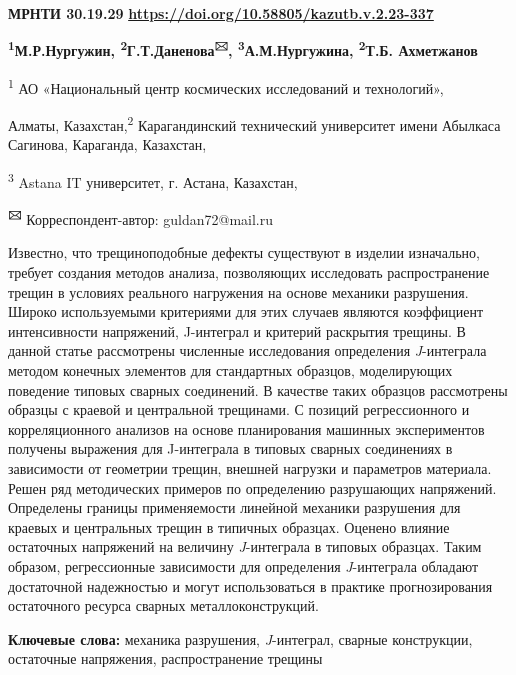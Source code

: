 \newpage
{\bfseries МРНТИ 30.19.29}
\hfill {\bfseries \href{https://doi.org/10.58805/kazutb.v.2.23-337}{https://doi.org/10.58805/kazutb.v.2.23-337}}


\begin{center}
{\bfseries \textsuperscript{1}М.Р.Нургужин, \textsuperscript{2}Г.Т.Даненова\textsuperscript{🖂}, \textsuperscript{3}А.М.Нургужина, \textsuperscript{2}Т.Б. Ахметжанов}

\textsuperscript{1} АО «Национальный центр космических исследований и
технологий»,

Алматы, Казахстан,\textsuperscript{2} Карагандинский технический
университет имени Абылкаса Сагинова, Караганда, Казахстан,

\textsuperscript{3} Astana IT университет, г. Астана, Казахстан,

{\bfseries \textsuperscript{🖂}} Корреспондент-автор: guldan72@mail.ru
\end{center}

Известно, что трещиноподобные дефекты существуют в изделии изначально,
требует создания методов анализа, позволяющих исследовать
распространение трещин в условиях реального нагружения на основе
механики разрушения. Широко используемыми критериями для этих случаев
являются коэффициент интенсивности напряжений, J-интеграл и критерий
раскрытия трещины. В данной статье рассмотрены численные исследования
определения \emph{J}-интеграла методом конечных элементов для
стандартных образцов, моделирующих поведение типовых сварных соединений.
В качестве таких образцов рассмотрены образцы с краевой и центральной
трещинами. С позиций регрессионного и корреляционного анализов на основе
планирования машинных экспериментов получены выражения для J-интеграла в
типовых сварных соединениях в зависимости от геометрии трещин, внешней
нагрузки и параметров материала. Решен ряд методических примеров по
определению разрушающих напряжений. Определены границы применяемости
линейной механики разрушения для краевых и центральных трещин в типичных
образцах. Оценено влияние остаточных напряжений на величину
\emph{J}-интеграла в типовых образцах. Таким образом, регрессионные
зависимости для определения \emph{J}-интеграла обладают достаточной
надежностью и могут использоваться в практике прогнозирования
остаточного ресурса сварных металлоконструкций.

{\bfseries Ключевые слова:} механика разрушения, \emph{J}-интеграл, сварные
конструкции, остаточные напряжения, распространение трещины


